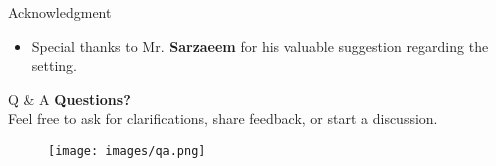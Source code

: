 \documentclass{beamer}
\begin{document}
\begin{frame}{Acknowledgment}
    \begin{itemize}
        \item Special thanks to Mr. \textbf{Sarzaeem} for his valuable suggestion regarding the setting.
    \end{itemize}
\end{frame}

\begin{frame}{Q \& A}
    \textbf{Questions?} \\
    Feel free to ask for clarifications, share feedback, or start a discussion.
    \vfill
    \begin{figure}
        \texttt{[image: images/qa.png]}
    \end{figure}
\end{frame}





\end{document}
